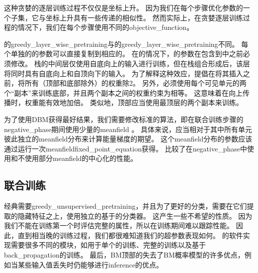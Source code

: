 
这种贪婪的逐层训练过程不仅仅是坐标上升。
因为我们在每个步骤优化参数的一个子集，它与坐标上升具有一些传递的相似性。
然而实际上，在贪婪逐层训练过程的情况下，我们在每个步骤使用不同的\gls{objective_function}。

的\gls{greedy_layer_wise_pretraining}与的\gls{greedy_layer_wise_pretraining}不同。
每个单独的的参数可以直接复制到相应的。
在的情况下，的参数在包含到中之前必须修改。
栈的中间层仅使用自底向上的输入进行训练，但在栈组合形成后，该层将同时具有自底向上和自顶向下的输入。
为了解释这种效应，\citet{SalHinton09}提倡在将其插入之前，将所有（顶部和底部除外）的权重除2。
另外，必须使用每个可见单元的两个``副本''来训练底部，并且两个副本之间的权重约束为相等。
这意味着在向上传播时，权重能有效地加倍。
类似地，顶部应当使用最顶层的两个副本来训练。

为了使用\gls{DBM}获得最好结果，我们需要修改标准的算法，即在联合训练步骤的\gls{negative_phase}期间使用少量的\gls{meanfield} \citep{SalHinton09}。
具体来说，应当相对于其中所有单元彼此独立的\gls{meanfield}分布来计算能量梯度的期望。
这个\gls{meanfield}分布的参数应该通过运行一次\gls{meanfield}\gls{fixed_point_equation}获得。
\citet{Goodfellow-et-al-NIPS2013}比较了在\gls{negative_phase}中使用和不使用部分\gls{meanfield}的中心化的性能。


\subsection{联合训练}
\label{sec:jointly_training_deep_boltzmann_machines}

经典需要\gls{greedy_unsupervised_pretraining}，并且为了更好的分类，需要在它们提取的隐藏特征之上，使用独立的基于的分类器。
这产生一些不希望的性质。
因为我们不能在训练第一个时评估完整的属性，所以在训练期间难以跟踪性能。
因此，直到相当晚的训练过程，我们都很难知道我们的超参数表现如何。
的软件实现需要很多不同的模块，如用于单个的训练、完整的训练以及基于\gls{back_propagation}的训练。
最后，\gls{BM}顶部的失去了\gls{BM}概率模型的许多优点，例如当某些输入值丢失时仍能够进行\gls{inference}的优点。

